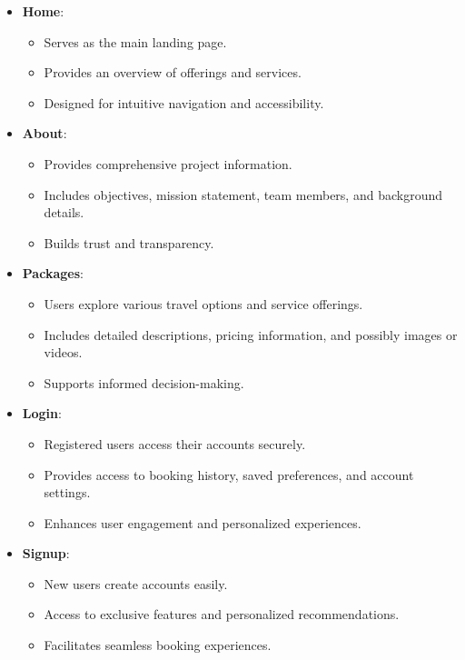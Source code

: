 \documentclass{scrreprt}
\begin{document}
\begin{itemize}
    \item \textbf{Home}:
    \begin{itemize}
        \item Serves as the main landing page.
        \item Provides an overview of offerings and services.
        \item Designed for intuitive navigation and accessibility.
    \end{itemize}
    
    \item \textbf{About}:
    \begin{itemize}
        \item Provides comprehensive project information.
        \item Includes objectives, mission statement, team members, and background details.
        \item Builds trust and transparency.
    \end{itemize}
    
    \item \textbf{Packages}:
    \begin{itemize}
        \item Users explore various travel options and service offerings.
        \item Includes detailed descriptions, pricing information, and possibly images or videos.
        \item Supports informed decision-making.
    \end{itemize}
    
    \item \textbf{Login}:
    \begin{itemize}
        \item Registered users access their accounts securely.
        \item Provides access to booking history, saved preferences, and account settings.
        \item Enhances user engagement and personalized experiences.
    \end{itemize}
    
    \item \textbf{Signup}:
    \begin{itemize}
        \item New users create accounts easily.
        \item Access to exclusive features and personalized recommendations.
        \item Facilitates seamless booking experiences.
    \end{itemize}
    

\end{itemize}
\end{document}
